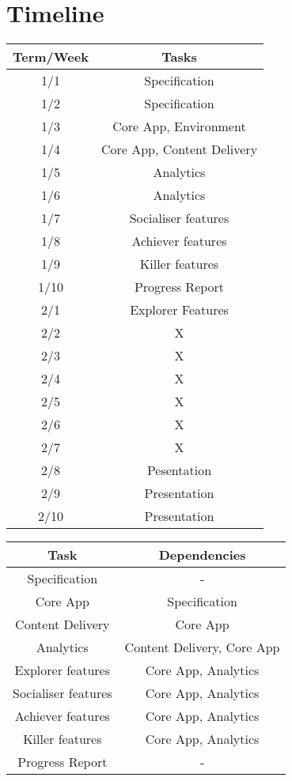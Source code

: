 \documentclass{report}
\begin{document}
\section*{Timeline}
\begin{tabular}{|c|c|}
\hline Term/Week & Tasks \\ 
\hline 1/1 & Specification \\ 
\hline 1/2 & Specification \\ 
\hline 1/3 & Core App, Environment \\ 
\hline 1/4 & Core App, Content Delivery \\ 
\hline 1/5 & Analytics \\ 
\hline 1/6 & Analytics \\ 
\hline 1/7 & Socialiser features \\ 
\hline 1/8 & Achiever features \\ 
\hline 1/9 & Killer features \\ 
\hline 1/10 & Progress Report \\ 
\hline 2/1 & Explorer Features \\ 
\hline 2/2 & X \\ 
\hline 2/3 & X \\ 
\hline 2/4 & X \\ 
\hline 2/5 & X \\ 
\hline 2/6 & X \\ 
\hline 2/7 & X \\ 
\hline 2/8 & Pesentation \\ 
\hline 2/9 & Presentation \\ 
\hline 2/10 & Presentation \\ 
\hline 
\end{tabular}
\newline
\begin{tabular}{|c|c|}
\hline Task & Dependencies \\ 
\hline Specification & - \\ 
\hline Core App & Specification \\ 
\hline Content Delivery & Core App \\ 
\hline Analytics & Content Delivery, Core App \\ 
\hline Explorer features & Core App, Analytics \\ 
\hline Socialiser features & Core App, Analytics \\ 
\hline Achiever features & Core App, Analytics \\ 
\hline Killer features & Core App, Analytics \\ 
\hline Progress Report & - \\ 
\hline 
\end{tabular} 
\end{document}
